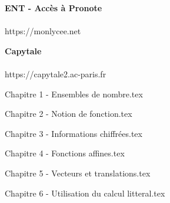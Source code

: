 \documentclass[11pt,a4paper,twoside,openany]{book}
\numberwithin{dummy}{section}
\theoremstyle{ocrenumboxTh}
\theoremstyle{ocrenumboxExercice}
\theoremstyle{ocrenumboxExercice}
\theoremstyle{ocrenumboxEx}
\theoremstyle{ocrenumboxEx}
\theoremstyle{ocrenumboxTh}
\theoremstyle{ocrenumboxTh*}
\theoremstyle{ocrenumboxTh}
\theoremstyle{ocrenumboxTh*}
\theoremstyle{ocrenumboxCoro}
\theoremstyle{ocrenumboxCoro*}
\theoremstyle{ocrenumboxCoro}
\theoremstyle{ocrenumboxCoro*}
\theoremstyle{ocrenumboxProp}
\theoremstyle{ocrenumboxProp*}
\theoremstyle{ocrenumboxProp}
\theoremstyle{ocrenumboxProp*}
\theoremstyle{ocrenumboxMéthode}
\theoremstyle{ocrenumboxMéthode}
\theoremstyle{ocrenumboxDef}
\theoremstyle{ocrenumboxDef*}
\theoremstyle{ocrenumboxDef}
\theoremstyle{ocrenumboxDef*}
\theoremstyle{ocrenumboxReg}
\theoremstyle{ocrenumboxReg*}
\theoremstyle{ocrenumboxReg}
\theoremstyle{ocrenumboxReg*}
\theoremstyle{ocrenumboxVoc}
\theoremstyle{ocrenumboxVoc}
\theoremstyle{ocrenumboxNot}
\theoremstyle{ocrenumboxNot}
\theoremstyle{ocrenumboxNot*}
\theoremstyle{ocrenumboxNot*}
\theoremstyle{ocrenum}
\begin{document}
\begin{minipage}[c]{0.5\linewidth}
   \begin{center}
\textbf{\textcolor{Couleur8}{ENT - Accès à Pronote}}\\
\vspace{5mm}
\\
\vspace{5mm}
\textcolor{Couleur6}{https://monlycee.net}\\
\end{center}
\end{minipage}
\hfill
\begin{minipage}[c]{0.3\linewidth}
     \begin{center}
\textbf{\textcolor{Couleur8}{Capytale}}\\
\vspace{5mm}
\\
\vspace{5mm}
\textcolor{Couleur6}{https://capytale2.ac-paris.fr}\\
\end{center}  
      \end{minipage}
      
      \vfill
      



\newpage



\setcounter{tocdepth}{1}
\tableofcontents


\newpage
\cleardoublepage
{Chapitre 1 - Ensembles de nombre.tex}

\cleardoublepage
{Chapitre 2 - Notion de fonction.tex}

\cleardoublepage
{Chapitre 3 - Informations chiffrées.tex}

\cleardoublepage
{Chapitre 4 - Fonctions affines.tex}

\cleardoublepage
{Chapitre 5 - Vecteurs et translations.tex}

\cleardoublepage
{Chapitre 6 - Utilisation du calcul litteral.tex}
\end{document}
